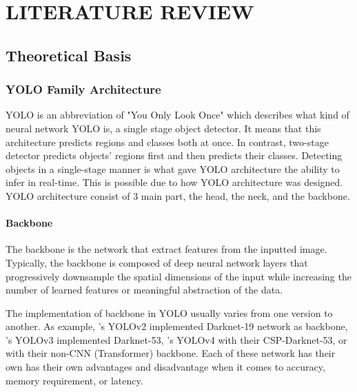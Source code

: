 \chapter{LITERATURE REVIEW}
\section{Theoretical Basis}
  \subsection{YOLO Family Architecture}
  YOLO is an abbreviation of "You Only Look Once" which describes what kind of neural network YOLO
  is, a single stage object detector. It means that this architecture predicts regions 
  and classes both at once. In contrast, two-stage detector predicts objects' regions first
  and then predicts their classes. Detecting objects in a single-stage manner is what gave YOLO
  architecture the ability to infer in real-time. This is possible due to how YOLO architecture
  was designed. YOLO architecture consist of 3 main part, the head, the neck, and the backbone.

   
    \subsubsection{Backbone}
    The backbone is the network that extract features from the inputted image.
    Typically, the backbone is composed of deep neural network layers that progressively 
    downsample the spatial dimensions of the input while increasing the number of 
    learned features or meaningful abstraction of the data.

    The implementation of backbone in YOLO usually varies from one version to another.
    As example, \textcite{yolov2}'s YOLOv2 implemented Darknet-19 network as backbone, 
    \textcite{yolov3}'s YOLOv3 implemented Darknet-53, \textcite{yolov4}'s YOLOv4
    with their CSP-Darknet-53, or \textcite{vityolo} with their non-CNN (Transformer) backbone.
    Each of these network has their own has their own advantages and disadvantage when
    it comes to accuracy, memory requirement, or latency.



